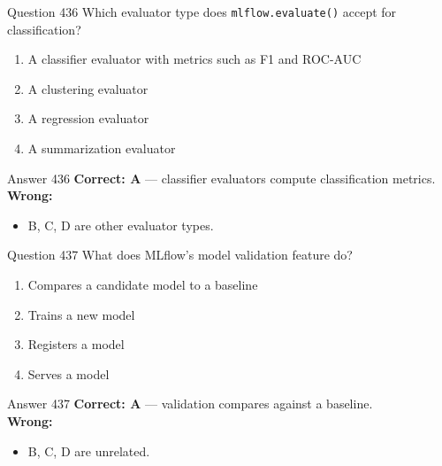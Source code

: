 \documentclass[aspectratio=169,11pt]{beamer}
\begin{document}
	\begin{frame}{Question 436}
		Which evaluator type does \texttt{mlflow.evaluate()} accept for classification?
		\begin{enumerate}[label=\Alph*.]
			\item A classifier evaluator with metrics such as F1 and ROC-AUC
			\item A clustering evaluator
			\item A regression evaluator
			\item A summarization evaluator
		\end{enumerate}
	\end{frame}
	\begin{frame}{Answer 436}
		\textbf{Correct: A} --- classifier evaluators compute classification metrics.\\
		\vspace{0.5em}
		\textbf{Wrong:}
		\begin{itemize}
			\item B, C, D are other evaluator types.
		\end{itemize}
	\end{frame}
	
	\begin{frame}{Question 437}
		What does MLflow's model validation feature do?
		\begin{enumerate}[label=\Alph*.]
			\item Compares a candidate model to a baseline
			\item Trains a new model
			\item Registers a model
			\item Serves a model
		\end{enumerate}
	\end{frame}
	\begin{frame}{Answer 437}
		\textbf{Correct: A} --- validation compares against a baseline.\\
		\vspace{0.5em}
		\textbf{Wrong:}
		\begin{itemize}
			\item B, C, D are unrelated.
		\end{itemize}
	\end{frame}
	
\end{document}
